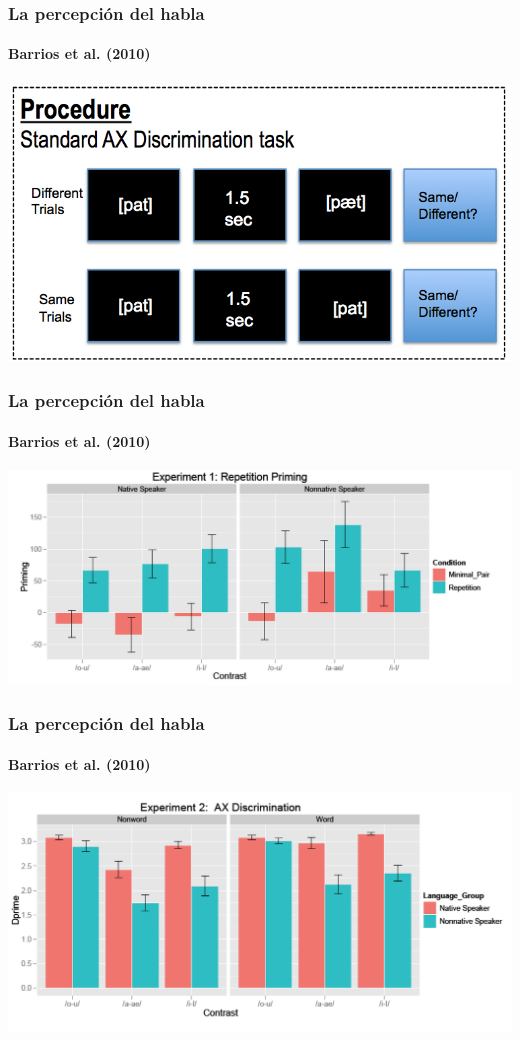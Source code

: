 \documentclass{beamer}
\begin{document}
\begin{frame}
	\frametitle{La percepción del habla}
	\framesubtitle{Barrios et al. (2010)}
	
	\begin{center}
		\includegraphics[scale=.25]{figures/barrios2.png}
	\end{center}
\end{frame}

\begin{frame}
	\frametitle{La percepción del habla}
	\framesubtitle{Barrios et al. (2010)}
	
	\begin{center}
		\includegraphics[scale=.25]{figures/barrios3.png}
	\end{center}
\end{frame}

\begin{frame}
	\frametitle{La percepción del habla}
	\framesubtitle{Barrios et al. (2010)}
	
	\begin{center}
		\includegraphics[scale=.25]{figures/barrios4.png}
	\end{center}
\end{frame}
\end{document}
